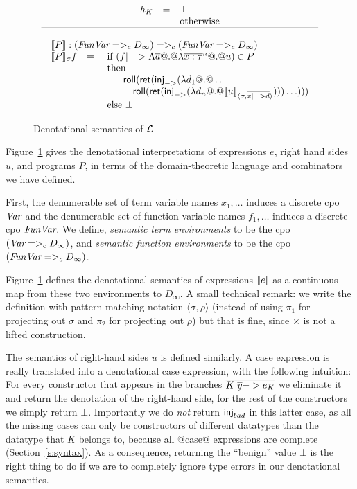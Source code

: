 \begin{figure}
$$\begin{array}{c}
\begin{array}{rcl}
              h_{K}  & = & \bot \\ 
                    &   &  \text{otherwise}
\end{array} \\
\hline \\
\begin{array}{rcl}
\multicolumn{3}{l}{\dbrace{P} : (\FVarCpo =>_c D_{\infty}) =>_c (\FVarCpo =>_c D_{\infty})}  \\
\dbrace{P}_{\sigma} f & = & 
   \text{ if } (f |-> \Lambda\as @.@ \lambda\oln{x:\tau}{n} @.@ u) \in P \\
&& \text{ then } \\
&& \quad\quad \roll(\ret(\inj{->}(\dlambda d_1 @.@ \ldots  \\
&& \quad\quad\quad \roll(\ret(\inj{->}(\dlambda d_n @.@ \interp{u}{\sigma}{\ol{x |-> d}})))\ldots))) \\
&& \text{ else } \bot 
\end{array}
\end{array}
$$
\caption{Denotational semantics of $\cal L$} \label{f:denot}
\end{figure}

Figure~\ref{f:denot} gives the denotational interpretations 
of expressions $e$, right hand sides $u$, and programs $P$, in 
terms of the domain-theoretic language and combinators we have defined.

First, the denumerable set of term variable names $x_1,\ldots$ induces a discrete 
cpo $\textit{Var}$  and the denumerable set of function variable names $f_1,\ldots$ induces a discrete 
cpo $\textit{FunVar}$. We define, {\em semantic term environments} to be the cpo $(\textit{Var} =>_c D_{\infty})$, 
and {\em semantic function environments} to be the cpo $(\textit{FunVar} =>_c D_{\infty})$. 

Figure~\ref{f:denot} defines the denotational semantics of expressions
$[\![e]\!]$ as a continuous map from these two environments to $D_{\infty}$.  
A small technical remark: we write
the definition with pattern matching notation
$\langle \sigma,\rho \rangle$ (instead of using $\pi_1$ for projecting
out $\sigma$ and $\pi_2$ for projecting out $\rho$) but that is fine,
since $\times$ is not a lifted construction.

The semantics of right-hand sides $u$ is defined similarly.
A case expression is really translated into a denotational case expression, with the following intuition: For every
constructor that appears in the branches $\overline{K\;\overline{y} -> e_K}$ we eliminate it and return the denotation of the right-hand
side, for the rest of the constructors we simply return $\bot$. Importantly we do {\em not} return $\mathsf{inj}_{bad}$ in this 
latter case, as all the missing cases can only be constructors of different datatypes than the 
datatype that $K$ belongs to, because all @case@ expressions are complete (Section~\ref{s:syntax}). 
As a consequence, returning the ``benign'' value $\bot$ is the right thing to do if we are 
to completely ignore type errors
in our denotational semantics. 

